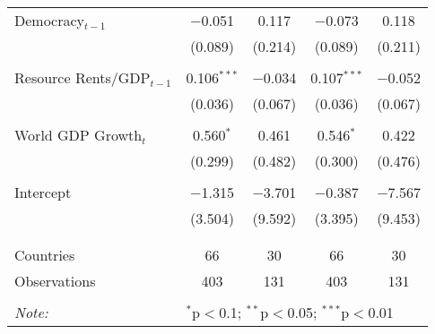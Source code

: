 \begin{table}[!htbp]
{\begin{tabular}{@{\extracolsep{5pt}}lcccc}
 Democracy$_{t-1}$ & $-$0.051 & 0.117 & $-$0.073 & 0.118 \\ 
  & (0.089) & (0.214) & (0.089) & (0.211) \\ 
  & & & & \\ 
 Resource Rents/GDP$_{t-1}$ & 0.106$^{***}$ & $-$0.034 & 0.107$^{***}$ & $-$0.052 \\ 
  & (0.036) & (0.067) & (0.036) & (0.067) \\ 
  & & & & \\ 
 World GDP Growth$_{t}$ & 0.560$^{*}$ & 0.461 & 0.546$^{*}$ & 0.422 \\ 
  & (0.299) & (0.482) & (0.300) & (0.476) \\ 
  & & & & \\ 
 Intercept & $-$1.315 & $-$3.701 & $-$0.387 & $-$7.567 \\ 
  & (3.504) & (9.592) & (3.395) & (9.453) \\ 
  & & & & \\ 
\hline \\[-1.8ex] 
Countries & 66 & 30 & 66 & 30 \\ 
Observations & 403 & 131 & 403 & 131 \\ 
\hline 
\hline \\[-1.8ex] 
\textit{Note:}  & \multicolumn{4}{l}{$^{*}$p$<$0.1; $^{**}$p$<$0.05; $^{***}$p$<$0.01} \\ 
\end{tabular}
} 
\end{table} 